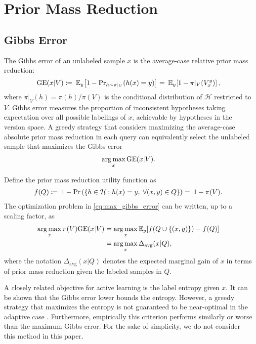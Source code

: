 \documentclass[runningheads, envcountsame, a4paper]{llncs}
\newcommand{\argmax}{\operatornamewithlimits{arg\,max}}
\begin{document}
\section{Prior Mass Reduction}
\label{sec:prior_mass_reduction}


\subsection{Gibbs Error}
\label{sec:gibbs_error}

The Gibbs error \cite{Cuong13} of an unlabeled sample $x$ is the average-case relative prior mass reduction:
\begin{align}
    \text{GE}(x | V) \coloneqq\: \mathbb{E}_y\! \left[ 1 - \textmd{Pr}_{h \sim \pi|_V}(h(x)=y) \right] 
    =\: \mathbb{E}_y\! \left[ 1 - \pi|_V(V_x^y) \right],
    \label{eq:gibbs_error}
\end{align}
where $\pi|_V(h) = \pi(h)/\pi(V)$ is the conditional distribution of $\mathcal{H}$ restricted to $V$.
Gibbs error measures the proportion of inconsistent hypotheses taking expectation over all possible labelings of $x$, achievable by hypotheses in the version space.
A greedy strategy that considers maximizing the average-case absolute prior mass reduction in each query can equivalently select the unlabeled sample that maximizes the Gibbs error
\begin{align}
    \argmax_x \text{GE}(x | V).
    \label{eq:max_gibbs_error}
\end{align}

Define the prior mass reduction utility function as
\begin{align}
    f(Q) \coloneqq\: 1 - \textmd{Pr} \left( \left\{h\in \mathcal{H}: h(x) = y, \; \forall (x,y) \in Q \right\} \right) 
    =\: 1 - \pi(V).
    \label{eq:prior_mass_reduc_util_func}
\end{align}
The optimization problem in \eqref{eq:max_gibbs_error} can be written, up to a scaling factor, as
\begin{align}
\argmax_x \pi(V) \text{GE}(x | V) 
    &= \argmax_x \mathbb{E}_y\! \left[ f(Q \cup \{(x,y)\}) - f(Q) \right] \\
    &= \argmax_x \Delta_{\text{avg}} (x | Q),
\end{align}
where the notation $\Delta_{\text{avg}}(x | Q)$ denotes the expected marginal gain of $x$ in terms of prior mass reduction given the labeled samples in $Q$.

A closely related objective for active learning is the label entropy given $x$. It can be shown that the Gibbs error lower bounds the entropy. However, a greedy strategy that maximizes the entropy is not guaranteed to be near-optimal in the adaptive case \cite{Cuong14}. Furthermore, empirically this criterion performs similarly or worse than the maximum Gibbs error. For the sake of simplicity, we do not consider this method in this paper.
\end{document}

